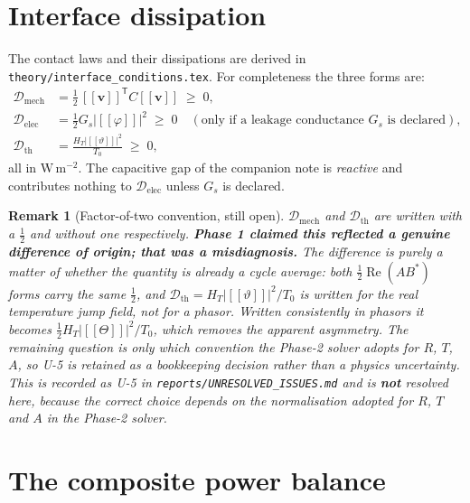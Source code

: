\documentclass[11pt]{article}
\newcommand{\bth}{\vartheta}
\newcommand{\bv}{\bm{v}}
\newcommand{\jmp}[1]{[\![#1]\!]}
\theoremstyle{plain}
\newtheorem{remark}{Remark}
\begin{document}
\section{Interface dissipation}
\label{sec:interface}

The contact laws and their dissipations are derived in
\texttt{theory/interface\_conditions.tex}. For completeness the three forms are:
\begin{align}
  \mathcal{D}_{\mathrm{mech}} &= \tfrac12\,\jmp{\bv}^{\mathsf T}C\jmp{\bv}
     \;\ge\;0, \label{eq:D-mech}\\
  \mathcal{D}_{\mathrm{elec}} &= \tfrac12 G_s\lvert\jmp{\varphi}\rvert^{2}
     \;\ge\;0 \quad(\text{only if a leakage conductance }G_s\text{ is declared}),\\
  \mathcal{D}_{\mathrm{th}} &= \frac{H_T\lvert\jmp{\bth}\rvert^{2}}{T_0}
     \;\ge\;0, \label{eq:D-th}
\end{align}
all in $\mathrm{W\,m^{-2}}$. The capacitive gap of the companion note is
\emph{reactive} and contributes nothing to $\mathcal{D}_{\mathrm{elec}}$ unless
$G_s$ is declared.

\begin{remark}[Factor-of-two convention, still open]
\label{rem:half}
$\mathcal{D}_{\mathrm{mech}}$ and $\mathcal{D}_{\mathrm{th}}$ are written with a
$\tfrac12$ and without one respectively. \textbf{Phase 1 claimed this reflected a
genuine difference of origin; that was a misdiagnosis.} The difference is purely a
matter of whether the quantity is already a cycle average: both
$\tfrac12\operatorname{Re}(AB^*)$ forms carry the same $\tfrac12$, and
$\mathcal{D}_{\mathrm{th}}=H_T\lvert\jmp{\bth}\rvert^2/T_0$ is written for the
\emph{real} temperature jump field, not for a phasor. Written consistently in
phasors it becomes $\tfrac12 H_T\lvert\jmp{\Theta}\rvert^2/T_0$, which removes the
apparent asymmetry. The remaining question is only which convention the Phase-2
solver adopts for $R$, $T$, $A$, so U-5 is retained as a \emph{bookkeeping}
decision rather than a physics uncertainty. This is recorded as
U-5 in \texttt{reports/UNRESOLVED\_ISSUES.md} and is \textbf{not} resolved here,
because the correct choice depends on the normalisation adopted for $R$, $T$ and
$A$ in the Phase-2 solver.
\end{remark}

\section{The composite power balance}
\label{sec:balance}
\end{document}
